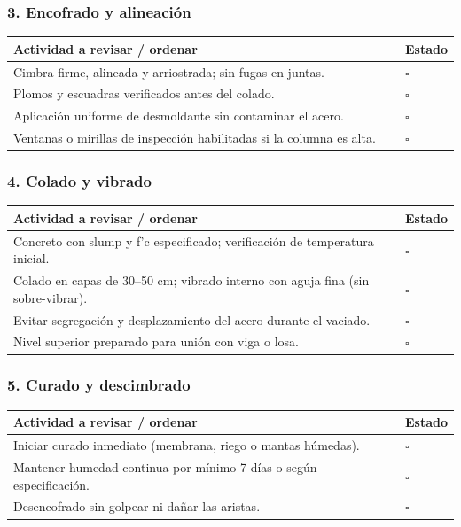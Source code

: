 \documentclass[12pt]{article}
\newcommand{\cbox}{\(\square\)}
\renewcommand{\cbox}{\(\square\)} %
\begin{document}
	\subsubsection*{3. Encofrado y alineación}
	\begin{tabularx}{\linewidth}{>{\raggedright\arraybackslash}p{0.93\linewidth} >{\centering\arraybackslash}m{0.07\linewidth}}
		\toprule
		\textbf{Actividad a revisar / ordenar} & \textbf{Estado}\\
		\midrule
		Cimbra firme, alineada y arriostrada; sin fugas en juntas. & \cbox \\
		Plomos y escuadras verificados antes del colado. & \cbox \\
		Aplicación uniforme de desmoldante sin contaminar el acero. & \cbox \\
		Ventanas o mirillas de inspección habilitadas si la columna es alta. & \cbox \\
		\bottomrule
	\end{tabularx}
	
	\subsubsection*{4. Colado y vibrado}
	\begin{tabularx}{\linewidth}{>{\raggedright\arraybackslash}p{0.93\linewidth} >{\centering\arraybackslash}m{0.07\linewidth}}
		\toprule
		\textbf{Actividad a revisar / ordenar} & \textbf{Estado}\\
		\midrule
		Concreto con slump y f’c especificado; verificación de temperatura inicial. & \cbox \\
		Colado en capas de 30–50 cm; vibrado interno con aguja fina (sin sobre-vibrar). & \cbox \\
		Evitar segregación y desplazamiento del acero durante el vaciado. & \cbox \\
		Nivel superior preparado para unión con viga o losa. & \cbox \\
		\bottomrule
	\end{tabularx}
	
	\subsubsection*{5. Curado y descimbrado}
	\begin{tabularx}{\linewidth}{>{\raggedright\arraybackslash}p{0.93\linewidth} >{\centering\arraybackslash}m{0.07\linewidth}}
		\toprule
		\textbf{Actividad a revisar / ordenar} & \textbf{Estado}\\
		\midrule
		Iniciar curado inmediato (membrana, riego o mantas húmedas). & \cbox \\
		Mantener humedad continua por mínimo 7 días o según especificación. & \cbox \\
		Desencofrado sin golpear ni dañar las aristas. & \cbox \\
		\bottomrule
	\end{tabularx}
	
\end{document}

